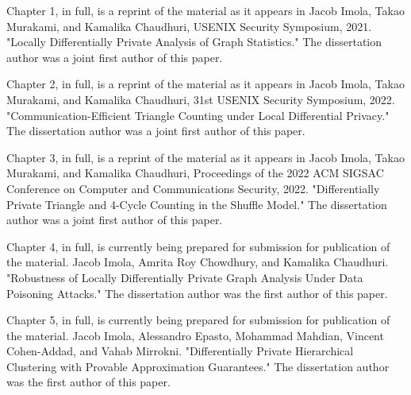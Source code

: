 \documentclass[12pt]{ucsddissertation}
\begin{document}
\begin{acknowledgements}
Chapter 1, in full, is a reprint of the material as it appears in Jacob Imola,
Takao Murakami, and Kamalika Chaudhuri, USENIX Security Symposium, 2021.
"Locally Differentially Private Analysis of Graph Statistics." 
The dissertation author was a joint first author of this paper.

Chapter 2, in full, is a reprint of the material as it appears in
Jacob Imola,
Takao Murakami, and Kamalika Chaudhuri, 31st USENIX Security Symposium, 2022.
"Communication-Efficient Triangle Counting under Local Differential Privacy." 
The dissertation author was a joint first author of this paper.

Chapter 3, in full, is a reprint of the material as it appears in Jacob Imola,
Takao Murakami, and Kamalika Chaudhuri, Proceedings of the 2022 ACM SIGSAC Conference on Computer and Communications Security, 2022. "Differentially Private Triangle and 4-Cycle Counting in the Shuffle Model." 
The dissertation author was a joint first author of this paper.

Chapter 4, in full, is currently being prepared for submission for publication of the material.
Jacob Imola, Amrita Roy Chowdhury, and Kamalika Chaudhuri.
"Robustness of Locally Differentially Private Graph Analysis Under Data Poisoning Attacks."
The dissertation author was the first author of this paper.

Chapter 5, in full, is currently being prepared for submission for publication of the material.
Jacob Imola, Alessandro Epasto, Mohammad Mahdian, Vincent Cohen-Addad, and Vahab Mirrokni.
"Differentially Private Hierarchical Clustering with Provable Approximation Guarantees."
The dissertation author was the first author of this paper.

\end{acknowledgements}
\end{document}
